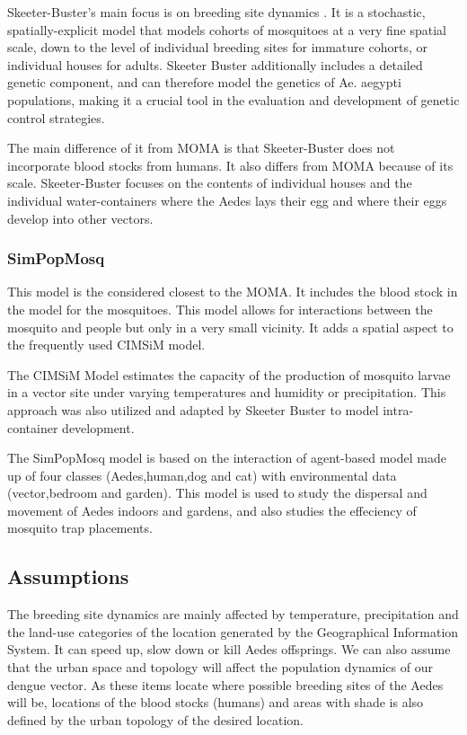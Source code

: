 Skeeter-Buster's main focus is on breeding site dynamics \cite{skeeter}. It is a stochastic, spatially-explicit model that models cohorts of mosquitoes at a very fine spatial scale, down to the level of individual breeding sites for immature cohorts, or individual houses for adults. Skeeter Buster additionally includes a detailed genetic component, and can therefore model the genetics of Ae. aegypti populations, making it a crucial tool in the evaluation and development of genetic control strategies. 

The main difference of it from MOMA is that Skeeter-Buster does not incorporate blood stocks from humans. It also differs from MOMA because of its scale. Skeeter-Buster focuses on the contents of individual houses and the individual water-containers where the Aedes lays their egg and where their eggs develop into other vectors. 

\subsubsection{SimPopMosq}

This model is the considered closest to the MOMA. It includes the blood stock in the model for the mosquitoes. This model allows for interactions between the mosquito and people but only in a very small vicinity\cite{sandro}. It adds a spatial aspect to the frequently used CIMSiM model. 

The CIMSiM Model estimates the capacity of the production of mosquito larvae in a vector site under varying temperatures and humidity or precipitation. This approach was also utilized and adapted by Skeeter Buster to model intra-container development.

The SimPopMosq model is based on the interaction of agent-based model made up of four classes (Aedes,human,dog and cat) with environmental data (vector,bedroom and garden). This model is used to study the dispersal and movement of Aedes indoors and gardens, and also studies the effeciency of mosquito trap placements.


\subsection{Assumptions}
The breeding site dynamics are mainly affected by temperature, precipitation and the land-use categories of the location generated by the Geographical Information System. It can speed up, slow down or kill Aedes offsprings. We can also assume that the urban space and topology will affect the population dynamics of our dengue vector. As these items locate where possible breeding sites of the Aedes will be, locations of the blood stocks (humans) and areas with shade is also defined by the urban topology of the desired location.


